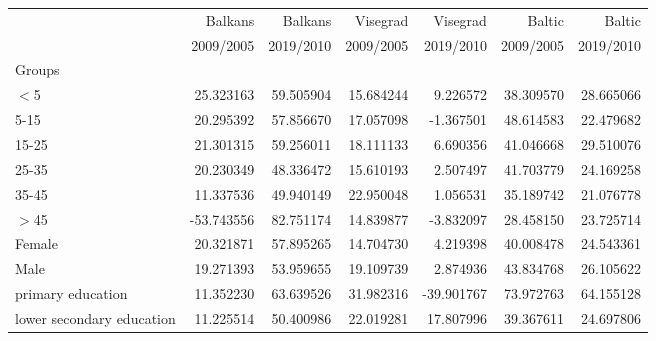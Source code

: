 \documentclass{article}
\begin{document}
\begin{table}[!htbp]
\begin{center}
{\begin{tabular}{lrrrrrr}
\toprule
{} &     Balkans &  Balkans    &   Visegrad &   Visegrad &     Baltic &     Baltic \\
{} &  2009/2005 &  2019/2010 &  2009/2005 &  2019/2010 &  2009/2005 &  2019/2010 \\
Groups                                &            &            &            &            &            &            \\
\midrule
$<$5                                    &  25.323163 &  59.505904 &  15.684244 &   9.226572 &  38.309570 &  28.665066 \\
5-15                                  &  20.295392 &  57.856670 &  17.057098 &  -1.367501 &  48.614583 &  22.479682 \\
15-25                                 &  21.301315 &  59.256011 &  18.111133 &   6.690356 &  41.046668 &  29.510076 \\
25-35                                 &  20.230349 &  48.336472 &  15.610193 &   2.507497 &  41.703779 &  24.169258 \\
35-45                                 &  11.337536 &  49.940149 &  22.950048 &   1.056531 &  35.189742 &  21.076778 \\
$>$45                                   & -53.743556 &  82.751174 &  14.839877 &  -3.832097 &  28.458150 &  23.725714 \\
Female                                &  20.321871 &  57.895265 &  14.704730 &   4.219398 &  40.008478 &  24.543361 \\
Male                                  &  19.271393 &  53.959655 &  19.109739 &   2.874936 &  43.834768 &  26.105622 \\
primary education                     &  11.352230 &  63.639526 &  31.982316 & -39.901767 &  73.972763 &  64.155128 \\
lower secondary education             &  11.225514 &  50.400986 &  22.019281 &  17.807996 &  39.367611 &  24.697806 \\

\end{tabular}}
\end{center}
\end{table}
\end{document}

